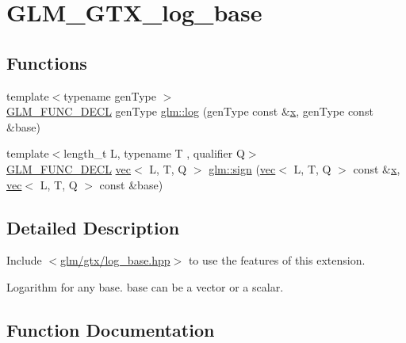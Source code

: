 \hypertarget{group__gtx__log__base}{}\section{G\+L\+M\+\_\+\+G\+T\+X\+\_\+log\+\_\+base}
\label{group__gtx__log__base}
\subsection*{Functions}
\begin{DoxyCompactItemize}
\item 
{\footnotesize template$<$typename gen\+Type $>$ }\\\mbox{\hyperlink{setup_8hpp_ab2d052de21a70539923e9bcbf6e83a51}{G\+L\+M\+\_\+\+F\+U\+N\+C\+\_\+\+D\+E\+CL}} gen\+Type \mbox{\hyperlink{group__gtx__log__base_ga60a7b0a401da660869946b2b77c710c9}{glm\+::log}} (gen\+Type const \&\mbox{\hyperlink{_s_d_l__opengl_8h_ad0e63d0edcdbd3d79554076bf309fd47}{x}}, gen\+Type const \&base)
\item 
{\footnotesize template$<$length\+\_\+t L, typename T , qualifier Q$>$ }\\\mbox{\hyperlink{setup_8hpp_ab2d052de21a70539923e9bcbf6e83a51}{G\+L\+M\+\_\+\+F\+U\+N\+C\+\_\+\+D\+E\+CL}} \mbox{\hyperlink{structglm_1_1vec}{vec}}$<$ L, T, Q $>$ \mbox{\hyperlink{group__gtx__log__base_ga04ef803a24f3d4f8c67dbccb33b0fce0}{glm\+::sign}} (\mbox{\hyperlink{structglm_1_1vec}{vec}}$<$ L, T, Q $>$ const \&\mbox{\hyperlink{_s_d_l__opengl_8h_ad0e63d0edcdbd3d79554076bf309fd47}{x}}, \mbox{\hyperlink{structglm_1_1vec}{vec}}$<$ L, T, Q $>$ const \&base)
\end{DoxyCompactItemize}


\subsection{Detailed Description}
Include $<$\mbox{\hyperlink{log__base_8hpp}{glm/gtx/log\+\_\+base.\+hpp}}$>$ to use the features of this extension.

Logarithm for any base. base can be a vector or a scalar. 

\subsection{Function Documentation}
\mbox{\label{group__gtx__log__base_ga60a7b0a401da660869946b2b77c710c9}} 
